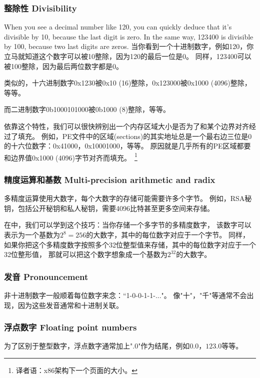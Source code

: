 \documentclass[UTF8,nofonts]{ctexart}
\begin{document}

\subsubsection{整除性 Divisibility}

When you see a decimal number like 120, you can quickly deduce that it's divisible by 10, because the last digit is zero.
In the same way, 123400 is divisible by 100, because two last digits are zeros.
当你看到一个十进制数字，例如120，你立马就知道这个数字可以被10整除，因为120的最后一位是0。
同样，123400可以被100整除，因为最后两位数字都是0。

类似的，十六进制数字0x1230被0x10 (16)整除，0x123000被0x1000 (4096)整除，等等。

而二进制数字0b1000101000被0b1000 (8)整除，等等。

依靠这个特性，我们可以很快辨别出一个内存区域大小是否为了和某个边界对齐经过了填充。
例如，\ac{PE}文件中的区域(sections)的其实地址总是一个最右边三位是0的十六位数字：0x41000，0x10001000，等等。
原因就是几乎所有的\ac{PE}区域都要和边界值0x1000 (4096)字节对齐而填充。~\footnote{译者语：x86架构下一个页面的大小。}

\subsubsection{精度运算和基数 Multi-precision arithmetic and radix}

多精度运算使用大数字，每个大数字的存储可能需要许多个字节。
例如，RSA秘钥，包括公开秘钥和私人秘钥，需要4096比特甚至更多空间来存储。

在中，我们可以学到这个技巧：当你存储一个多字节的多精度数字，
该数字可以表示为一个基数为$2^8=256$的大数字，其中的每位数字对应于一个字节。
同样，如果你把这个多精度数字按照多个32位整型值来存储，其中的每位数字对应于一个32位整形值，
那就可以把这个数字想象成一个基数为$2^{32}$的大数字。

\subsubsection{发音 Pronouncement}

非十进制数字一般顺着每位数字来念：“1-0-0-1-1-..."。
像"十"，"千"等通常不会出现，因为这些发音通常和十进制关联。

\subsubsection{浮点数字 Floating point numbers}

为了区别于整型数字，浮点数字通常加上".0"作为结尾，例如$0.0$，$123.0$等等。
\end{document}
